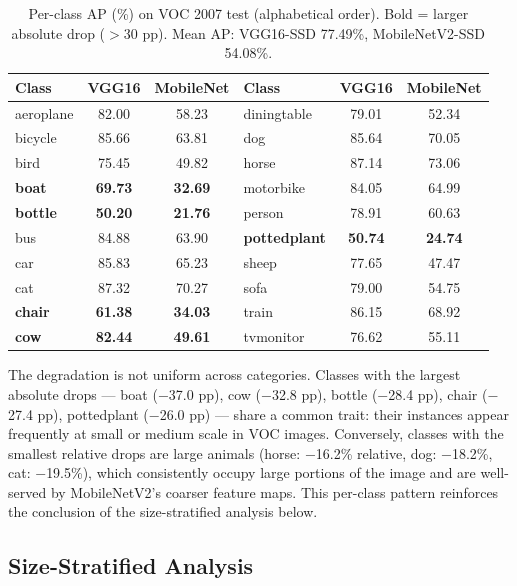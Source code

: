 \documentclass{article}
\begin{document}
\begin{table}[h]
  \caption{Per-class AP (\%) on VOC 2007 test (alphabetical order). Bold = larger absolute drop ($>$30 pp). Mean AP: VGG16-SSD 77.49\%, MobileNetV2-SSD 54.08\%.}
  \label{tab:per_class}
  \centering
  \small
  \begin{tabular}{lcc|lcc}
    \toprule
    Class & VGG16 & MobileNet & Class & VGG16 & MobileNet \\
    \midrule
    aeroplane   & 82.00 & 58.23 & diningtable & 79.01 & 52.34 \\
    bicycle     & 85.66 & 63.81 & dog         & 85.64 & 70.05 \\
    bird        & 75.45 & 49.82 & horse       & 87.14 & 73.06 \\
    \textbf{boat}        & \textbf{69.73} & \textbf{32.69} & motorbike   & 84.05 & 64.99 \\
    \textbf{bottle}      & \textbf{50.20} & \textbf{21.76} & person      & 78.91 & 60.63 \\
    bus         & 84.88 & 63.90 & \textbf{pottedplant} & \textbf{50.74} & \textbf{24.74} \\
    car         & 85.83 & 65.23 & sheep       & 77.65 & 47.47 \\
    cat         & 87.32 & 70.27 & sofa        & 79.00 & 54.75 \\
    \textbf{chair}       & \textbf{61.38} & \textbf{34.03} & train       & 86.15 & 68.92 \\
    \textbf{cow}         & \textbf{82.44} & \textbf{49.61} & tvmonitor   & 76.62 & 55.11 \\
    \bottomrule
  \end{tabular}
\end{table}

The degradation is not uniform across categories. Classes with the largest absolute drops — boat ($-$37.0 pp), cow ($-$32.8 pp), bottle ($-$28.4 pp), chair ($-$27.4 pp), pottedplant ($-$26.0 pp) — share a common trait: their instances appear frequently at small or medium scale in VOC images. Conversely, classes with the smallest relative drops are large animals (horse: $-$16.2\% relative, dog: $-$18.2\%, cat: $-$19.5\%), which consistently occupy large portions of the image and are well-served by MobileNetV2's coarser feature maps. This per-class pattern reinforces the conclusion of the size-stratified analysis below.

\subsection{Size-Stratified Analysis}
\end{document}
